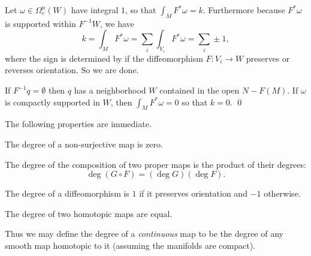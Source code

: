     Let $\omega\in\Omega_c^n(W)$ have integral $1$, so that $\int_MF^*\omega=k$.
    Furthermore because $F^*\omega$ is supported within $F^{-1}W$, we have
    $$ k = \int_MF^*\omega = \sum_i\int_{V_i}F^*\omega = \sum_i\pm1 , $$
    where the sign is determined by if the diffeomorphism $F\colon V_i\to W$ preserves or reverses orientation.
    So we are done.

    If $F^{-1}q=\emptyset$ then $q$ has a neighborhood $W$ contained in the open $N-F(M)$.
    If $\omega$ is compactly supported in $W$, then $\int_MF^*\omega=0$ so that $k=0$.
    \qed

\eproof

The following properties are immediate.

\bprop

    \benum
        \item The degree of a non-surjective map is zero.
        \item The degree of the composition of two proper maps is the product of their degrees:
        $$ \deg(G\circ F) = (\deg G)(\deg F) . $$
        \item The degree of a diffeomorphism is $1$ if it preserves orientation and $-1$ otherwise.
        \item The degree of two homotopic maps are equal.
    \eenum

\eprop

Thus we may define the degree of a {\it continuous\/} map to be the degree of any smooth map homotopic to it (assuming the
manifolds are compact).

